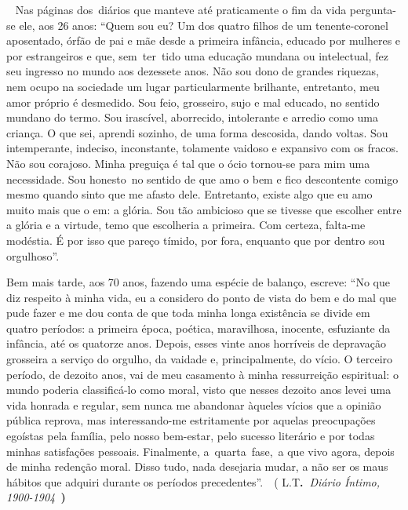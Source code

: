 ~ Nas páginas dos~diários que manteve até praticamente o fim da vida
pergunta-se ele, aos 26 anos: ``Quem sou eu? Um dos quatro filhos de um
tenente-coronel aposentado, órfão de pai e mãe desde a primeira
infância, educado por mulheres e por estrangeiros e que, sem~ter~tido
uma educação mundana ou intelectual, fez seu ingresso no mundo aos
dezessete anos. Não sou dono de grandes riquezas, nem ocupo na sociedade
um lugar particularmente brilhante, entretanto, meu amor próprio é
desmedido. Sou feio, grosseiro, sujo e mal educado, no sentido mundano
do termo. Sou irascível, aborrecido, intolerante e arredio como uma
criança. O que sei, aprendi sozinho, de uma forma descosida, dando
voltas. Sou intemperante, indeciso, inconstante, tolamente vaidoso e
expansivo com os fracos. Não sou corajoso. Minha preguiça é tal que o
ócio tornou-se para mim uma necessidade. Sou honesto~no sentido de que
amo o bem e fico descontente comigo mesmo quando sinto que me afasto
dele. Entretanto, existe algo que eu amo muito mais que o em: a glória.
Sou tão ambicioso que se tivesse que escolher entre a glória e a
virtude, temo que escolheria a primeira. Com certeza, falta-me modéstia.
É por isso que pareço tímido, por fora, enquanto que por dentro sou
orgulhoso''.

Bem mais tarde, aos 70 anos, fazendo uma espécie de balanço, escreve:
``No que diz respeito à minha vida, eu a considero do ponto de vista do
bem e do mal que pude fazer e me dou conta de que toda minha longa
existência se divide em quatro períodos: a primeira época, poética,
maravilhosa, inocente, esfuziante da infância, até os quatorze anos.
Depois, esses vinte anos horríveis de depravação grosseira a serviço do
orgulho, da vaidade e, principalmente, do vício. O terceiro período, de
dezoito anos, vai de meu casamento à minha ressurreição espiritual: o
mundo poderia classificá-lo como moral, visto que nesses dezoito anos
levei uma vida honrada e regular, sem nunca me abandonar àqueles vícios
que a opinião pública reprova, mas interessando-me estritamente por
aquelas preocupações egoístas pela família, pelo nosso bem-estar, pelo
sucesso literário e por todas minhas satisfações pessoais. Finalmente,
a~quarta~fase,~a que vivo agora, depois de minha redenção moral. Disso
tudo, nada desejaria mudar, a não ser os maus hábitos que adquiri
durante os períodos precedentes''.~~( L.T\textbf{.~}\emph{Diário Íntimo,
1900-1904~}\textbf{)}

